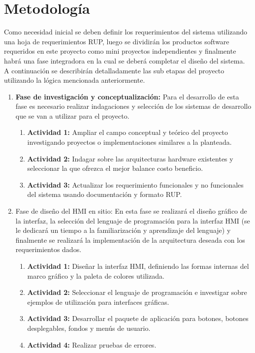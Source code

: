 \section{Metodología}

Como necesidad inicial se deben definir los requerimientos del sistema utilizando una hoja de requerimientos RUP, luego se dividirán los productos software requeridos en este proyecto como mini proyectos independientes y finalmente habrá una fase integradora en la cual se deberá completar el diseño del sistema. A continuación se describirán detalladamente las sub etapas del proyecto utilizando la lógica mencionada anteriormente.

\begin{enumerate}

\item \textbf{Fase de investigación y conceptualización:} Para el desarrollo de esta fase es necesario realizar indagaciones y selección de los sistemas de desarrollo que se van a utilizar para el proyecto.


  \begin{enumerate}
    \item \textbf{Actividad 1:} Ampliar el campo conceptual y teórico del proyecto investigando  proyectos o implementaciones similares a la planteada.
    \item \textbf{Actividad 2:} Indagar sobre las arquitecturas hardware existentes y seleccionar la que ofrezca el mejor balance costo beneficio.
    \item \textbf{Actividad 3:} Actualizar los requerimiento funcionales y no funcionales del sistema usando documentación y formato RUP.
	\end{enumerate}
    
\item Fase de diseño del HMI en sitio: En esta fase se realizará el diseño gráfico de la interfaz, la selección del lenguaje de programación para la interfaz HMI (se le dedicará un tiempo a la familiarización y aprendizaje del lenguaje) y finalmente se realizará la implementación de la arquitectura deseada con los requerimientos dados.

  \begin{enumerate}
      \item \textbf{Actividad 1:} Diseñar la interfaz HMI, definiendo las formas internas del marco gráfico y la paleta de colores utilizada.
      \item \textbf{Actividad 2:} Seleccionar el lenguaje de programación e investigar sobre ejemplos de utilización para interfaces gráficas.
      \item \textbf{Actividad 3:} Desarrollar el paquete de aplicación para botones, botones desplegables, fondos y menús de usuario.
      \item \textbf{Actividad 4:} Realizar pruebas de errores.
	\end{enumerate}
	

\end{enumerate}
